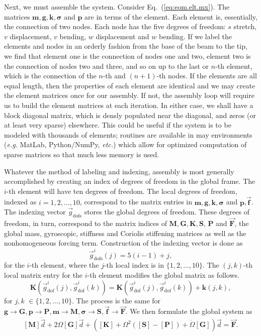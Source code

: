 Next, we must assemble the system. Consider Eq.~(\ref{eq:eom.elt.mx}). The matrices $\mathbf{m},\mathbf{g},\mathbf{k},\mathbf{\sigma}$ and $\mathbf{p}$ are in terms of the element. Each element is, essentially, the connection of two nodes. Each node has the five degrees of freedom: $s$ stretch, $v$ displacement, $v$ bending, $w$ displacement and $w$ bending. If we label the elements and nodes in an orderly fashion from the base of the beam to the tip, we find that element one is the connection of nodes one and two, element two is the connection of nodes two and three, and so on up to the last or $n$-th element, which is the connection of the $n$-th and $(n+1)$-th nodes. If the elements are all equal length, then the properties of each element are identical and we may create the element matrices once for our assembly. If not, the assembly loop will require us to build the element matrices at each iteration. In either case, we shall have a block diagonal matrix, which is densly populated near the diagonal, and zeros (or at least very sparse) elsewhere. This could be useful if the system is to be modeled with thousands of elements; routines are available in may environments (\emph{e.g.} MatLab, Python/NumPy, \emph{etc.}) which allow for optimized computation of sparse matrices so that much less memory is used.

Whatever the method of labeling and indexing, assembly is most generally accomplished by creating an index of degrees of freedom in the global frame. The $i$-th element will have ten degrees of freedom. The local degrees of freedom, indexed as $i=1,2,\dots,10$, correspond to the matrix entries in $\mathbf{m},\mathbf{g},\mathbf{k},\mathbf{\sigma}$ and $\mathbf{p}$,$\vec{\mathbf{f}}$. The indexing vector $\vec g_{\text{dofs}}$ stores the global degrees of freedom. These degrees of freedom, in turn, correspond to the matrix indices of $\mathbf{M},\mathbf{G},\mathbf{K},\mathbf{S}$, $\mathbf{P}$ and $\vec{\mathbf{F}}$, the global mass, gyroscopic, stiffness and Coriolis stiffening matrices as well as the nonhomogeneous forcing term. Construction of the indexing vector is done as
\begin{equation}
\vec g_{\text{dofs}}^i(j) = 5(i-1)+j,
\end{equation}
for the $i$-th element, where the $j$-th local index is in $\lbrace1,2,\dots,10\rbrace$. The $(j,k)$-th local matrix entry for the $i$-th element modifies the global matrix as follows.
\begin{equation}
\mathbf{K}(\vec{g}_{\text{dof}}^i(j),\vec{g}_{\text{dof}}^i(k)) = \mathbf{K}(\vec{g}_{\text{dof}}^i(j),\vec{g}_{\text{dof}}^i(k))+\mathbf{k}(j,k),
\end{equation}
for $j,k$ $\in\lbrace1,2,\dots,10\rbrace$. The process is the same for $\textbf{g}\rightarrow\textbf{G},\mathbf{p}\rightarrow\mathbf{P},\mathbf{m}\rightarrow\mathbf{M},\mathbf{\sigma}\rightarrow\mathbf{S},\vec{\mathbf{f}}\rightarrow\vec{\mathbf{F}}$. We then formulate the global system as
\begin{equation}
\mathbf{[M]}\ddot{\vec d} +2\Omega\mathbf{[G]}\dot{\vec d} + (\mathbf{[K]}+\Omega^2(\mathbf{[S]}-\mathbf{[P]})+\dot\Omega\mathbf{[G]} )\vec d = \vec{\mathbf{F}}.
\label{eq:full_mx_eom}
\end{equation}

